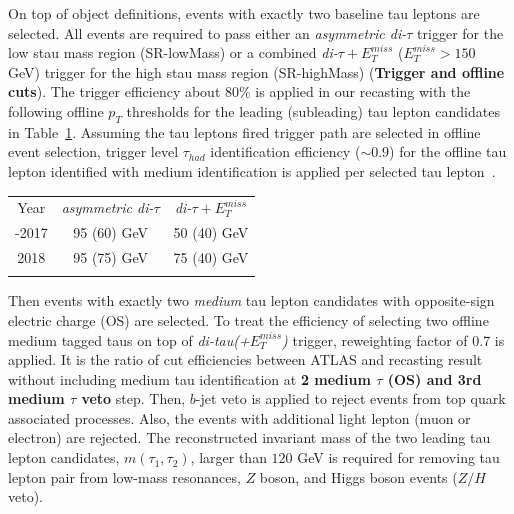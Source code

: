 \documentclass{ws-mpla}
\begin{document}

On top of object definitions, events with exactly two baseline tau leptons are selected.
All events are required to pass either an \textit{asymmetric di-$\tau$} trigger for the low stau mass region (SR-lowMass) or a combined \textit{di-$\tau +E^{miss}_T$} ($E^{miss}_T > 150$ GeV) trigger for the high stau mass region (SR-highMass) (\textbf{Trigger and offline cuts}).
The trigger efficiency about $80\%$ is applied in our recasting with the following offline $p_T$ thresholds for the leading (subleading) tau lepton candidates in Table~\ref{tab:trig-eff}.
Assuming the tau leptons fired trigger path are selected in offline event selection, trigger level $\tau_{had}$ identification efficiency ($\sim 0.9$) for the offline tau lepton identified with medium identification is applied per selected tau lepton~\cite{ATLAS:2017mpa}.

\begin{table}[h!]
  {\begin{tabular}{@{}c c c@{}} \toprule
  Year & \textit{asymmetric di-$\tau$} & \textit{di-$\tau +E^{miss}_T$} \\
  \colrule
 2015-2017 & 95 (60) GeV & 50 (40) GeV \\
 2018 & 95 (75) GeV & 75 (40) GeV \\ 
  \botrule
  \end{tabular}\label{tab:trig-eff} }
\end{table}

Then events with exactly two \textit{medium} tau lepton candidates with opposite-sign electric charge (OS) are selected. To treat the efficiency of selecting two offline medium tagged taus on top of \textit{di-tau(+$E^{miss}_T$)} trigger, reweighting factor of 0.7 is applied. It is the ratio of cut efficiencies between ATLAS and recasting result without including medium tau identification at \textbf{2 medium $\tau$ (OS) and 3rd medium $\tau$ veto} step.
Then, $b$-jet veto is applied to reject events from top quark associated processes.
Also, the events with additional light lepton (muon or electron) are rejected.
The reconstructed invariant mass of the two leading tau lepton candidates, $m(\tau_1,\tau_2)$, larger than $120$ GeV is required for removing tau lepton pair from low-mass resonances, $Z$ boson, and Higgs boson events ($Z/H$ veto).
\end{document}
